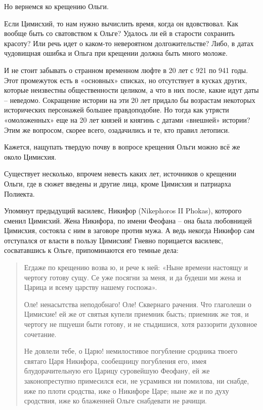 Но вернемся ко крещению Ольги.

Если Цимисхий, то нам нужно вычислить время, когда он вдовствовал. Как вообще быть со сватовством к Ольге? Удалось ли ей в старости сохранить красоту? Или речь идет о каком-то невероятном долгожительстве? Либо, в датах чудовищная ошибка и Ольга при крещении должна быть много моложе.

И не стоит забывать о странном временном люфте в 20 лет с 921 по 941 годы. Этот промежуток есть в «основных» списках, но отсутствует в кусках других, которые неизвестны общественности целиком, а что в них после, какие идут даты – неведомо. Сокращение истории на эти 20 лет придало бы возрастам некоторых исторических персонажей большее правдоподобие. Но тогда как утрясти «омоложенных» еще на 20 лет князей и княгинь с датами «внешней» истории? Этим же вопросом, скорее всего, озадачились и те, кто правил летописи.

Кажется, нащупать твердую почву в вопросе крещения Ольги можно всё же около Цимисхия.

Существует несколько, впрочем невесть каких лет, источников о крещении Ольги, где в сюжет введены и другие лица, кроме Цимисхия и патриарха Полиекта. 

Упомянут предыдущий василевс, Никифор (Nikephor\-os II Phokas), которого сменил Цимисхий. Жена Никифора, по имени Феофана – она была любовницей Цимисхия, состояла с ним в заговоре против мужа. А ведь некогда Никифор сам отступался от власти в пользу Цимисхия! Гневно порицается василевс, сосватавшись к Ольге, припоминаются его темные дела:

\begin{quotation}
Егдаже по крещению возва ю, и рече к ней: «Ныне времени настоящу и чертогу готову сущу. Се уже посягни за меня, и да будеши ми жена и Царица и всему царству нашему госпожа».

Оле! ненасытства неподобнаго! Оле! Сквернаго рачения. Что глаголеши о Цимисхие! ей же от святыя купели приемник бысть; приемник же тоя, и чертогу не пщуеши быти готову, и не стыдишися, хотя раззорити духовное сочетание. 

Не довлели тебе, о Царю! немилостивое погубление сродника твоего святаго Царя Никифора, сообещницу погубления его, имея блудорачительную его Царицу суровейшую Феофану, ей же законопреступно примесился еси, не усрамився ни помилова, ни снабде, иже по плоти сродства, иже о Никифоре Царе; ныне же и по духу сродствия, иже ко блаженней Ольге снабдевати не рачищи.
\end{quotation}


